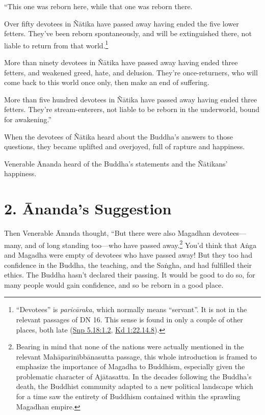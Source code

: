 \documentclass[12pt,openany]{book}%
\begin{document}
“This one was reborn here, while that one was reborn there. 

Over fifty devotees in \textsanskrit{Ñātika} have passed away having ended the five lower fetters. They’ve been reborn spontaneously, and will be extinguished there, not liable to return from that world.\footnote{“Devotees” is \textit{\textsanskrit{paricāraka}}, which normally means “servant”. It is not in the relevant passages of DN 16. This sense is found  in only a couple of other places, both late (\href{https://suttacentral.net/snp5.18/en/sujato\#1.2}{Snp 5.18:1.2}, \href{https://suttacentral.net/pli-tv-kd1/en/sujato\#22.14.8}{Kd 1:22.14.8}). } 

More than ninety devotees in \textsanskrit{Ñātika} have passed away having ended three fetters, and weakened greed, hate, and delusion. They’re once-returners, who will come back to this world once only, then make an end of suffering. 

More than five hundred devotees in \textsanskrit{Ñātika} have passed away having ended three fetters. They’re stream-enterers, not liable to be reborn in the underworld, bound for awakening.” 

When the devotees of \textsanskrit{Ñātika} heard about the Buddha’s answers to those questions, they became uplifted and overjoyed, full of rapture and happiness. 

Venerable Ānanda heard of the Buddha’s statements and the \textsanskrit{Ñātikans}’ happiness. 

\section*{2. Ānanda’s Suggestion }

Then Venerable Ānanda thought, “But there were also Magadhan devotees—many, and of long standing too—who have passed away.\footnote{Bearing in mind that none of the nations were actually mentioned in the relevant \textsanskrit{Mahāparinibbānasutta} passage, this whole introduction is framed to emphasize the importance of Magadha to Buddhism, especially given the problematic character of \textsanskrit{Ajātasattu}. In the decades following the Buddha’s death, the Buddhist community adapted to a new political landscape which for a time saw the entirety of Buddhism contained within the sprawling Magadhan empire. } You’d think that \textsanskrit{Aṅga} and Magadha were empty of devotees who have passed away! But they too had confidence in the Buddha, the teaching, and the \textsanskrit{Saṅgha}, and had fulfilled their ethics. The Buddha hasn’t declared their passing. It would be good to do so, for many people would gain confidence, and so be reborn in a good place. 
\end{document}

